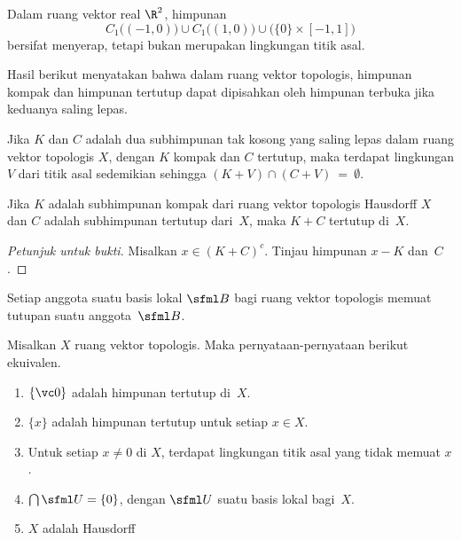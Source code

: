 \begin{exam} Dalam ruang vektor real $\R^2$, himpunan
    \[ C_1\bigl((-1,0)\bigr) \cup C_1\bigl((1,0)\bigr) \cup \bigl(\{0\} \times [-1,1]\bigr) \]
bersifat menyerap, tetapi bukan merupakan lingkungan titik asal.
\end{exam}

Hasil berikut menyatakan bahwa dalam ruang vektor topologis, himpunan kompak dan himpunan tertutup dapat dipisahkan oleh himpunan terbuka jika keduanya saling lepas.

\begin{prop} Jika $K$ dan $C$ adalah dua subhimpunan tak kosong yang saling lepas dalam ruang vektor topologis $X$, dengan $K$ kompak dan $C$ tertutup, maka terdapat
lingkungan $V$ dari titik asal sedemikian sehingga $(K + V) \cap (C + V)~=~\emptyset$.
\end{prop}

\begin{cor} Jika $K$ adalah subhimpunan kompak dari ruang vektor topologis Hausdorff $X$ dan $C$ adalah subhimpunan tertutup dari~$X$, maka $K + C$
tertutup di~$X$.
\end{cor}

\begin{proof}[\emph{Petunjuk untuk bukti}] Misalkan $x \in (K + C)^c$.  Tinjau himpunan $x - K$ dan~$C$.  \ns
\end{proof}

\begin{cor} Setiap anggota suatu basis lokal $\sfml B$ bagi ruang vektor topologis memuat tutupan suatu anggota~$\sfml B$.
\end{cor}

\begin{prop} Misalkan $X$ ruang vektor topologis.  Maka pernyataan-pernyataan berikut ekuivalen.
  \begin{enumerate}[label=\rm{(\alph*)}]
    \item $\{\vc 0\}$ adalah himpunan tertutup di~$X$.
    \item $\{x\}$ adalah himpunan tertutup untuk setiap $x \in X$.
    \item Untuk setiap $x \ne 0$ di $X$, terdapat lingkungan titik asal yang tidak memuat $x$.
    \item $\bigcap \sfml U = \{0\}$, dengan $\sfml U$ suatu basis lokal bagi~$X$.
    \item $X$ adalah Hausdorff
  \end{enumerate}
\end{prop}

